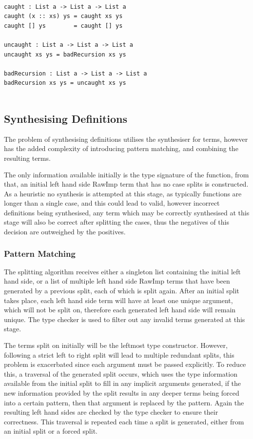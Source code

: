 \documentclass[a4paper]{article}
\begin{document}
\begin{center}
  \begin{verbatim}

caught : List a -> List a -> List a
caught (x :: xs) ys = caught xs ys
caught [] ys        = caught [] ys

uncaught : List a -> List a -> List a
uncaught xs ys = badRecursion xs ys

badRecursion : List a -> List a -> List a
badRecursion xs ys = uncaught xs ys
    
  \end{verbatim}
\end{center}


\subsection{Synthesising Definitions}
\label{sec:org7318356}

The problem of synthesising definitions utilises the synthesiser for
terms, however has the added complexity of introducing pattern matching, 
and combining the resulting terms. 

The only information available initially is the type 
signature of the function, from that, an initial left hand side RawImp
term that has no case splits is constructed. As a heuristic no synthesis 
is attempted at this stage, as typically functions are longer than a single 
case, and this could lead to valid, however incorrect definitions being
synthesised, any term which may be correctly synthesised at this stage will 
also be correct after splitting the cases, thus the negatives of this decision
are outweighed by the positives.

\subsubsection{Pattern Matching}
\label{sec:org38930cc}
The splitting algorithm receives either a singleton list containing the initial
left hand side, or a list of multiple left hand side RawImp terms that have been generated by a previous split, 
each of which is split again. After an initial split takes place, each left hand side term will have
at least one unique argument, which will not be split on, therefore each generated
left hand side will remain unique. The type checker is used to filter out any
invalid terms generated at this stage. 

The terms split on initially will be the leftmost type constructor. However, following a strict 
left to right split will lead to multiple redundant splits, this problem is 
exacerbated since each argument must be passed explicitly. To reduce this, 
a traversal of the generated split occurs, which uses the type information 
available from the initial split to fill in any implicit arguments generated, 
if the new information provided by the split results in any deeper terms 
being forced into a certain pattern, then that argument is replaced by the pattern.
Again the resulting left hand sides are checked by the type checker to ensure their
correctness. This traversal is repeated each time a split is generated, either from an
initial split or a forced split.
\end{document}
